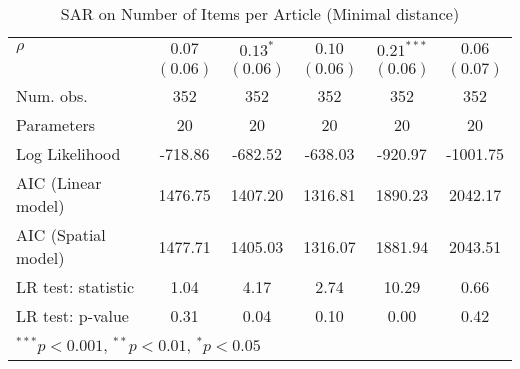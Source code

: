 \begin{table}[!h]
\begin{center}
\begin{tabular}{l c c c c c }
$\rho$                  & $0.07$       & $0.13^{*}$   & $0.10$       & $0.21^{***}$ & $0.06$       \\
                        & $(0.06)$     & $(0.06)$     & $(0.06)$     & $(0.06)$     & $(0.07)$     \\
\midrule
Num. obs.               & 352          & 352          & 352          & 352          & 352          \\
Parameters              & 20           & 20           & 20           & 20           & 20           \\
Log Likelihood          & -718.86      & -682.52      & -638.03      & -920.97      & -1001.75     \\
AIC (Linear model)      & 1476.75      & 1407.20      & 1316.81      & 1890.23      & 2042.17      \\
AIC (Spatial model)     & 1477.71      & 1405.03      & 1316.07      & 1881.94      & 2043.51      \\
LR test: statistic      & 1.04         & 4.17         & 2.74         & 10.29        & 0.66         \\
LR test: p-value        & 0.31         & 0.04         & 0.10         & 0.00         & 0.42         \\
\bottomrule
\multicolumn{6}{l}{\scriptsize{$^{***}p<0.001$, $^{**}p<0.01$, $^*p<0.05$}}
\end{tabular}
\caption{SAR on Number of Items per Article (Minimal distance)}
\label{table:coefficients}
\end{center}
\end{table}
